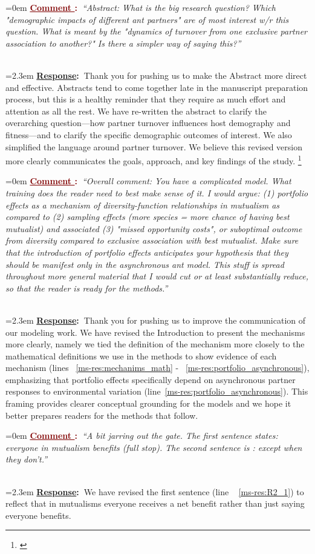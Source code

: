 \documentclass[12pt]{article}
\newcounter{cN}
\newcommand{\comment}[1]{
	\vspace{2em}
	\refstepcounter{cN} %
	\noindent \hangindent=0em \textbf{\textcolor{Maroon}{\uline{Comment \thecN}:~}}\emph{``#1''}
	}
\newcommand{\response}[1]{
	\\[0.25em]
	\hangindent=2.3em \textbf{\textcolor{NavyBlue}{\uline{Response}:~}}#1
	}
\newcommand{\tom}[2]{{\color{red}{#1}}\footnote{\textit{\color{red}{#2}}}}
\begin{document}
\comment{Abstract: What is the big research question? 
Which "demographic impacts of different ant partners" are of most interest w/r this question. 
What is meant by the "dynamics of turnover from one exclusive partner association to another?" Is there a simpler way of saying this?}
\response{Thank you for pushing us to make the Abstract more direct and effective. 
	Abstracts tend to come together late in the manuscript preparation process, but this is a healthy reminder that they require as much effort and attention as all the rest. 
	We have re-written the abstract to clarify the overarching question—how partner turnover influences host demography and fitness—and to clarify the specific demographic outcomes of interest. 
We also simplified the language around partner turnover.
We believe this revised version more clearly communicates the goals, approach, and key findings of the study.
\tom{}{See the new abstract because I edited heavily. You may want to adjust this response accordingly.}
}

\comment{Overall comment: You have a complicated model. 
What training does the reader need to best make sense of it. 
I would argue: (1) portfolio effects as a mechanism of diversity-function relationships in mutualism as compared to (2) sampling effects (more species = more chance of having best mutualist) and associated (3) "missed opportunity costs", or suboptimal outcome from diversity compared to exclusive association with best mutualist. 
Make sure that the introduction of portfolio effects anticipates your hypothesis that they should be manifest only in the asynchronous ant model. 
This stuff is spread throughout more general material that I would cut or at least substantially reduce, so that the reader is ready for the methods.}
\response{Thank you for pushing us to improve the communication of our modeling work. 
We have revised the Introduction to present the mechanisms more clearly, namely we tied the definition of the mechanism more closely to the mathematical definitions we use in the methods to show evidence of each mechanism (lines ~\ref{ms-res:mechanims_math} - ~\ref{ms-res:portfolio_asynchronous}), emphasizing that portfolio effects specifically depend on asynchronous partner responses to environmental variation (line~\ref{ms-res:portfolio_asynchronous}).
This framing provides clearer conceptual grounding for the models and we hope it better prepares readers for the methods that follow.}

\comment{A bit jarring out the gate. The first sentence states: everyone in mutualism benefits (full stop). The second sentence is : except when they don't.}
\response{We have revised the first sentence (line ~ \ref{ms-res:R2_1}) to reflect that in mutualisms everyone receives a net benefit rather than just saying everyone benefits.}
\end{document}
